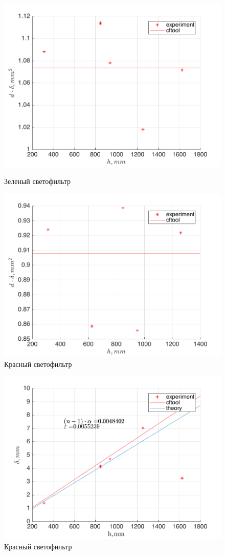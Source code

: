 \begin{figure}[ht]
\begin{minipage}[b]{0.55\linewidth}

\includegraphics[width=\textwidth]{data/dd_g.png}
\caption{Зеленый светофильтр}
\label{fig:dd_g}
\end{minipage}
\hspace{0.1cm}
\begin{minipage}[b]{0.55\linewidth}
\centering
\includegraphics[width=\textwidth]{data/dd_r.png}
\caption{Красный светофильтр}
\label{fig:dd_r}
\end{minipage}
\end{figure}
\begin{figure}[]
	\centering
	\includegraphics[width=0.\textwidth]{data/d_r.png}
	\caption{Красный светофильтр}
	\label{fig:d_r}
\end{figure}
